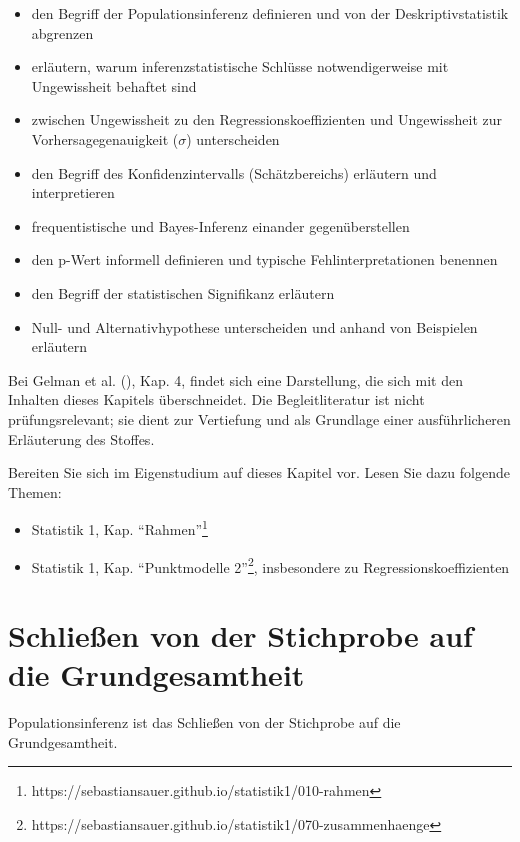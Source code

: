 \documentclass[
  ngerman,
  letterpaper,
  twoside,
  open=any]{scrbook}
\providecommand{\tightlist}{%
  \setlength{\itemsep}{0pt}\setlength{\parskip}{0pt}}\usepackage{longtable,booktabs,array}
\theoremstyle{definition}
\theoremstyle{plain}
\theoremstyle{definition}
\theoremstyle{definition}
\theoremstyle{definition}
\theoremstyle{definition}
\theoremstyle{remark}
\begin{document}
\begin{itemize}
\tightlist
\item
  den Begriff der Populationsinferenz definieren und von der
  Deskriptivstatistik abgrenzen
\item
  erläutern, warum inferenzstatistische Schlüsse notwendigerweise mit
  Ungewissheit behaftet sind
\item
  zwischen Ungewissheit zu den Regressionskoeffizienten und Ungewissheit
  zur Vorhersagegenauigkeit (\(\sigma\)) unterscheiden
\item
  den Begriff des Konfidenzintervalls (Schätzbereichs) erläutern und
  interpretieren
\item
  frequentistische und Bayes-Inferenz einander gegenüberstellen
\item
  den p-Wert informell definieren und typische Fehlinterpretationen
  benennen
\item
  den Begriff der statistischen Signifikanz erläutern
\item
  Null- und Alternativhypothese unterscheiden und anhand von Beispielen
  erläutern
\end{itemize}

Bei Gelman et al. (), Kap. 4, findet sich
eine Darstellung, die sich mit den Inhalten dieses Kapitels
überschneidet. Die Begleitliteratur ist nicht prüfungsrelevant; sie
dient zur Vertiefung und als Grundlage einer ausführlicheren Erläuterung
des Stoffes.

Bereiten Sie sich im Eigenstudium auf dieses Kapitel vor. Lesen Sie dazu
folgende Themen:

\begin{itemize}
\tightlist
\item
  Statistik 1, Kap. \enquote{Rahmen}\footnote{https://sebastiansauer.github.io/statistik1/010-rahmen}
\item
  Statistik 1, Kap. \enquote{Punktmodelle 2}\footnote{https://sebastiansauer.github.io/statistik1/070-zusammenhaenge},
  insbesondere zu Regressionskoeffizienten
\end{itemize}

\section{Schließen von der Stichprobe auf die
Grundgesamtheit}\label{schlieuxdfen-von-der-stichprobe-auf-die-grundgesamtheit}

Populationsinferenz ist das Schließen von der Stichprobe auf die
Grundgesamtheit.
\end{document}

